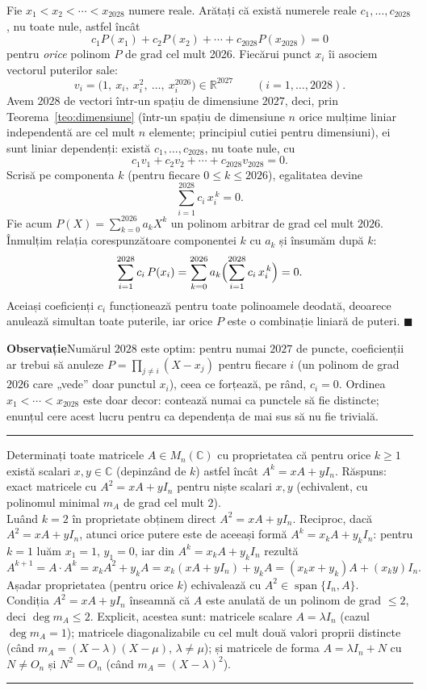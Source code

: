 Fie $x_1 < x_2 < \cdots < x_{2028}$ numere reale. Arătați că există numerele reale $c_1,\ldots,c_{2028}$, nu toate nule, astfel încât
\[
c_1P(x_1) + c_2P(x_2) + \cdots + c_{2028}P(x_{2028}) = 0
\]
pentru \emph{orice} polinom $P$ de grad cel mult 2026.
\sol Fiecărui punct $x_i$ îi asociem vectorul puterilor sale:
\[
v_i = \bigl(1,\ x_i,\ x_i^2,\ \ldots,\ x_i^{2026}\bigr) \in \mathbb{R}^{2027}
\qquad (i = 1,\ldots,2028).
\]
Avem $2028$ de vectori într-un spațiu de dimensiune $2027$, deci, prin Teorema~\ref{teo:dimensiune} (într-un spațiu de dimensiune $n$ orice mulțime liniar independentă are cel mult $n$ elemente; principiul cutiei pentru dimensiuni), ei sunt liniar dependenți: există $c_1,\ldots,c_{2028}$, nu toate nule, cu
\[
c_1v_1 + c_2v_2 + \cdots + c_{2028}v_{2028} = 0.
\]
Scrisă pe componenta $k$ (pentru fiecare $0 \le k \le 2026$), egalitatea devine
\[
\sum_{i=1}^{2028} c_i\,x_i^{\,k} = 0.
\]
Fie acum $P(X) = \sum_{k=0}^{2026} a_kX^k$ un polinom arbitrar de grad cel mult $2026$. Înmulțim relația corespunzătoare componentei $k$ cu $a_k$ și însumăm după $k$:
\[
\sum_{i=1}^{2028} c_i\,P(x_i) = \sum_{k=0}^{2026} a_k\Bigl(\sum_{i=1}^{2028} c_i\,x_i^{\,k}\Bigr) = 0.
\]
Aceiași coeficienți $c_i$ funcționează pentru \textup{toate} polinoamele deodată, deoarece anulează simultan toate puterile, iar orice $P$ este o combinație liniară de puteri. $\blacksquare$

\vspace{2mm}
\noindent\textbf{\large Observație}\quad Numărul $2028$ este optim: pentru numai $2027$ de puncte, coeficienții ar trebui să anuleze $P = \prod_{j\neq i}(X - x_j)$ pentru fiecare $i$ (un polinom de grad $2026$ care „vede'' doar punctul $x_i$), ceea ce forțează, pe rând, $c_i = 0$. Ordinea $x_1 < \cdots < x_{2028}$ este doar decor: contează numai ca punctele să fie distincte; enunțul cere acest lucru pentru ca dependența de mai sus să nu fie trivială.
\vspace{1mm}\hrule

Determinați toate matricele $A\in M_n(\mathbb{C})$ cu proprietatea că pentru orice $k\ge1$ există scalari $x,y\in\mathbb{C}$ (depinzând de $k$) astfel încât $A^k=xA+yI_n$.
\sol Răspuns: exact matricele cu $A^2=xA+yI_n$ pentru niște scalari $x,y$ (echivalent, cu polinomul minimal $m_A$ de grad cel mult $2$).\\[2pt]
Luând $k=2$ în proprietate obținem direct $A^2=xA+yI_n$. Reciproc, dacă $A^2=xA+yI_n$, atunci orice putere este de aceeași formă $A^k=x_kA+y_kI_n$: pentru $k=1$ luăm $x_1=1$, $y_1=0$, iar din $A^k=x_kA+y_kI_n$ rezultă
\[ A^{k+1}=A\cdot A^k=x_kA^2+y_kA=x_k(xA+yI_n)+y_kA=(x_kx+y_k)A+(x_ky)I_n. \]
Așadar proprietatea (pentru orice $k$) echivalează cu $A^2\in\operatorname{span}\{I_n,A\}$.\\[2pt]
Condiția $A^2=xA+yI_n$ înseamnă că $A$ este anulată de un polinom de grad $\le2$, deci $\deg m_A\le2$. Explicit, acestea sunt: matricele scalare $A=\lambda I_n$ (cazul $\deg m_A=1$); matricele diagonalizabile cu cel mult două valori proprii distincte (când $m_A=(X-\lambda)(X-\mu)$, $\lambda\neq\mu$); și matricele de forma $A=\lambda I_n+N$ cu $N\neq O_n$ și $N^2=O_n$ (când $m_A=(X-\lambda)^2$).
\vspace{1mm}\hrule

